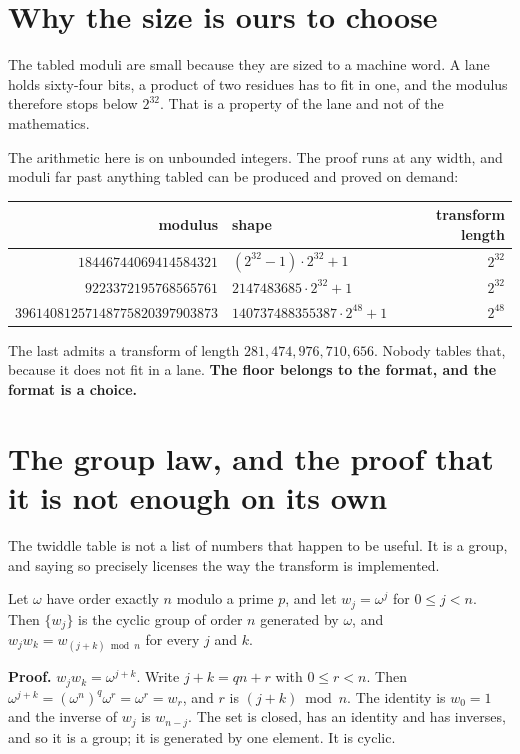 \section{Why the size is ours to choose}

The tabled moduli are small because they are sized to a machine word. A lane holds sixty-four bits, a product of two residues has to fit in one, and the modulus therefore stops below \(2^{32}\). That is a property of the lane and not of the mathematics.

The arithmetic here is on unbounded integers. The proof runs at any width, and moduli far past anything tabled can be produced and proved on demand:

\begin{center}
\begin{tabular}{@{}rlr@{}}
\toprule
modulus & shape & transform length \\
\midrule
\(18446744069414584321\) & \((2^{32}-1) \cdot 2^{32} + 1\) & \(2^{32}\) \\
\(9223372195768565761\) & \(2147483685 \cdot 2^{32} + 1\) & \(2^{32}\) \\
\(39614081257148775820397903873\) & \(140737488355387 \cdot 2^{48} + 1\) & \(2^{48}\) \\
\bottomrule
\end{tabular}
\end{center}

The last admits a transform of length \(281{,}474{,}976{,}710{,}656\). Nobody tables that, because it does not fit in a lane. \textbf{The floor belongs to the format, and the format is a choice.}

\section{The group law, and the proof that it is not enough on its own}

The twiddle table is not a list of numbers that happen to be useful. It is a group, and saying so precisely licenses the way the transform is implemented.

\begin{proposition}
Let \(\omega\) have order exactly \(n\) modulo a prime \(p\), and let \(w_j = \omega^j\) for \(0 \le j < n\). Then \(\{w_j\}\) is the cyclic group of order \(n\) generated by \(\omega\), and \(w_j w_k = w_{(j+k) \bmod n}\) for every \(j\) and \(k\).
\end{proposition}

\textbf{Proof.} \(w_j w_k = \omega^{j+k}\). Write \(j + k = qn + r\) with \(0 \le r < n\). Then \(\omega^{j+k} = (\omega^n)^q \omega^r = \omega^r = w_r\), and \(r\) is \((j+k) \bmod n\). The identity is \(w_0 = 1\) and the inverse of \(w_j\) is \(w_{n-j}\). The set is closed, has an identity and has inverses, and so it is a group; it is generated by one element. It is cyclic. \qedsymbol

